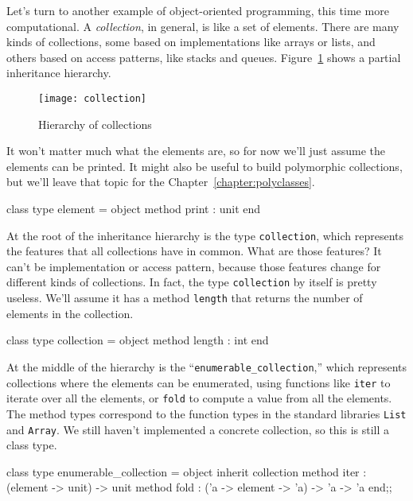 
Let's turn to another example of object-oriented programming, this time more computational.
A \emph{collection}, in general, is like a set of elements.  There are many kinds of collections,
some based on implementations like arrays or lists, and others based on access patterns, like stacks
and queues.  Figure~\ref{figure:collection-hierarchy} shows a partial inheritance hierarchy.

\begin{figure}
\centerline{\texttt{[image: collection]}}
\caption{Hierarchy of collections}
\label{figure:collection-hierarchy}
\end{figure}

It won't matter much what the elements are, so for now we'll just assume the elements can be
printed.  It might also be useful to build polymorphic collections, but we'll leave that topic for
the Chapter~\ref{chapter:polyclasses}.

\begin{ocaml}
class type element = object method print : unit end
\end{ocaml}
%
At the root of the inheritance hierarchy is the type \hbox{\lstinline/collection/}, which represents the
features that all collections have in common.  What are those features?  It can't be implementation
or access pattern, because those features change for different kinds of collections.  In fact, the
type \hbox{\lstinline/collection/} by itself is pretty useless.  We'll assume it has a
method \hbox{\lstinline/length/} that returns the number of elements in the collection.

\begin{ocaml}
class type collection =
object
   method length : int
end
\end{ocaml}
%
At the middle of the hierarchy is the ``\hbox{\lstinline/enumerable_collection/},'' which represents
collections where the elements can be enumerated, using functions like \hbox{\lstinline/iter/} to iterate
over all the elements, or \hbox{\lstinline/fold/} to compute a value from all the elements.  The method types
correspond to the function types in the standard libraries \hbox{\lstinline/List/}
and \hbox{\lstinline/Array/}.  We still haven't implemented a concrete collection, so this is still a class
type.

\begin{ocaml}
class type enumerable_collection =
object
   inherit collection
   method iter : (element -> unit) -> unit
   method fold : ('a -> element -> 'a) -> 'a -> 'a
end;;
\end{ocaml}

